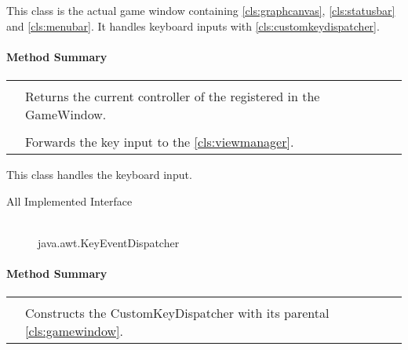 This class is the actual game window containing \ref{cls:graphcanvas}, \ref{cls:statusbar} and \ref{cls:menubar}. It handles keyboard inputs with \ref{cls:customkeydispatcher}. \\ 

\centerdash

\paragraph*{Method Summary}
\paragraph*{}
\begin{longtable}{Lp{10cm}}
	\startmethodtable
	 \\
	& Returns the current controller of the registered in the GameWindow. \\
	 \\
	& Forwards the key input to the \ref{cls:viewmanager}. \\ \hline
\end{longtable}


This class handles the keyboard input. \\ 

\begin{description}
	\item[All Implemented Interface] \hfill \\
	java.awt.KeyEventDispatcher
\end{description}
\centerdash

\paragraph*{Method Summary}
\paragraph*{}
\begin{longtable}{Lp{10cm}}
	\startmethodtable
	 \\
	& Constructs the CustomKeyDispatcher with its parental \ref{cls:gamewindow}. \\\hline
\end{longtable}

